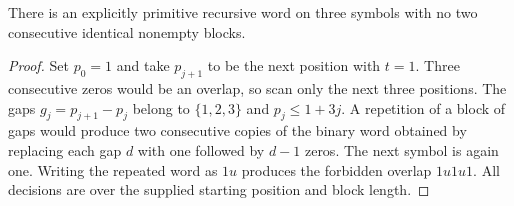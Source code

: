 \begin{corollary}\label{result69}
There is an explicitly primitive recursive word on three symbols with no two consecutive identical nonempty blocks.
\end{corollary}
\begin{proof}
Set $p_0=1$ and take $p_{j+1}$ to be the next position with $t=1$. Three consecutive zeros would be an overlap, so scan only the next three positions. The gaps $g_j=p_{j+1}-p_j$ belong to $\{1,2,3\}$ and $p_j\le 1+3j$. A repetition of a block of gaps would produce two consecutive copies of the binary word obtained by replacing each gap $d$ with one followed by $d-1$ zeros. The next symbol is again one. Writing the repeated word as $1u$ produces the forbidden overlap $1u1u1$. All decisions are over the supplied starting position and block length.
\end{proof}

